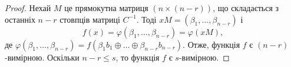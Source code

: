 \begin{proof}
    Нехай $M$ це прямокутна матриця $(n \times (n-r))$, що складається з останніх $n - r$ стовпців матриці $C^{-1}$. 
    Тоді $xM = (\beta_1, \ldots, \beta_{n-r})$ і
    \begin{equation*}
        f(x) = \varphi(\beta_1, \ldots, \beta_{n-r}) = \varphi(xM),
    \end{equation*}
    де $\varphi(\beta_1, \ldots, \beta_{n-r}) = f(\beta_1 b_1 \oplus \ldots \oplus \beta_{n-r} b_{n-r})$. Отже, 
    функція $f$ є $(n-r)$-вимірною. Оскільки $n - r \leq s$, то функція $f$ є $s$-вимірною.
\end{proof}

